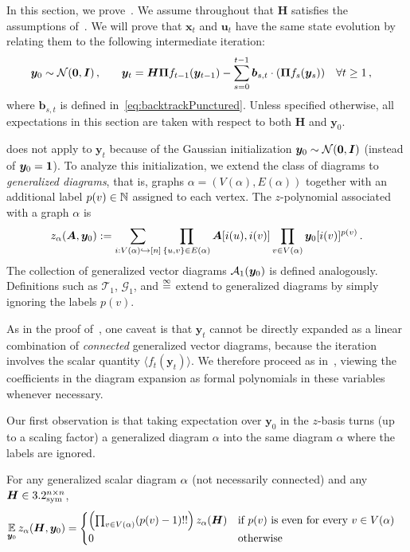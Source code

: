 In this section, we prove~. We assume throughout that $\bm H$ satisfies the assumptions of~.
We will prove that $\bm x_t$ and $\bm u_t$ have the same state evolution by relating them to the following intermediate iteration:
\begin{alignat}{2}
    \bm y_0 &\sim {\cal N}(\bm 0, \bm I)\,,\quad &\bm y_t &= \bm H \bm \Pi f_{t-1}(\bm y_{t-1}) - \sum_{s=0}^{t-1} \bm b_{s,t} \cdot (\bm \Pi  f_s(\bm y_s))\quad \forall t\ge 1\,,\label{eq:ampUnpunctured}
\end{alignat}
where $\bm b_{s,t}$ is defined in~\cref{eq:backtrackPunctured}.
Unless specified otherwise, all expectations in this section are taken with respect to both $\bm H$ and $\bm y_0$.

 does not apply 
to $\bm y_t$ because of the Gaussian initialization ${\bm y}_0 \sim {\cal N}({\bm 0}, {\bm I})$ (instead of ${\bm y}_0 = \bm{1}$).
To analyze this initialization, we extend the class of diagrams to {\em generalized diagrams}, that is, graphs $\alpha = (V(\alpha),E(\alpha))$ together with an additional label $p(v) \in \mathbb{N}$ assigned to each vertex.
The $z$-polynomial associated with a graph $\alpha$ is
\[
    z_\alpha({\bm A}, {\bm y}_0) := \sum_{i : V(\alpha) \hookrightarrow [n]} \prod_{\{u,v\} \in E(\alpha)} {\bm A}[i(u),i(v)] \prod_{v \in V(\alpha)} {\bm y}_0[i(v)]^{p(v)}\,.
\]
The collection of generalized vector diagrams ${\cal A}_1(\bm y_0)$ is defined analogously.
Definitions such as $\mathcal T_1$, $\mathcal G_1$, and $\overset{\infty}{=}$ extend to generalized diagrams by simply ignoring the labels $p(v)$.

As in the proof of~, one caveat is that $\bm y_t$ cannot be directly expanded as a linear combination of {\em connected} generalized vector diagrams, because the iteration involves the scalar quantity $\langle f_t(\bm y_t)\rangle$. 
We therefore proceed as in~, viewing the coefficients in the diagram expansion as formal polynomials in these variables whenever necessary.

Our first observation is that taking
expectation over $\bm y_0$ in the $z$-basis
turns (up to a
scaling factor) a
generalized diagram $\alpha$
into the same diagram $\alpha$ where
the labels are ignored.

\begin{lemma}\label{lem:initialization-expectation}
    For any generalized scalar diagram $\alpha$ (not necessarily connected) and any ${\bm H}\in 3.2^{n\times n}_{\mathrm{sym}}$,
    \begin{align*}
        \operatorname*{\mathbb{E}}_{{\bm y}_0} z_{\alpha}({\bm H}, {\bm y}_0) &= \begin{cases}
            \left(\prod_{v \in V(\alpha)} (p(v) - 1)!!\right) z_{\alpha}({\bm H}) & \text{if $p(v)$ is even for every $v\in V(\alpha)$}\\
            0 & \text{otherwise}
        \end{cases}
    \end{align*}
\end{lemma}
    
